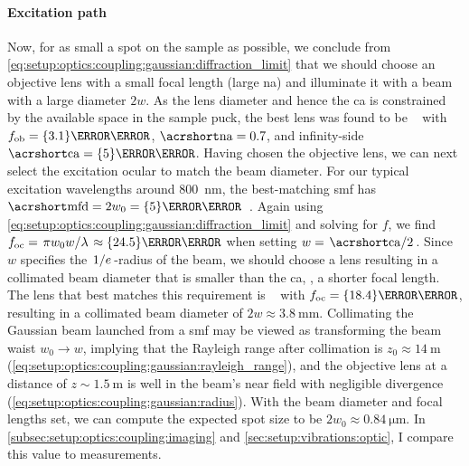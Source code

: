 \paragraph{Excitation path}
Now, for as small a spot on the sample as possible, we conclude from \cref{eq:setup:optics:coupling:gaussian:diffraction_limit} that we should choose an objective lens with a small focal length \fob (large \acrshort{na}) and illuminate it with a beam with a large diameter $2 w$.
As the lens diameter and hence the \acrfull{ca}
is constrained by the available space in the sample puck, the best lens was found to be \objectivelens~\cite{Thorlabs354330} with $\fob = \qty{3.1}{\milli\meter}$, $\NA = \num{0.7}$, and infinity-side $\CA = \qty{5}{\milli\meter}$.
Having chosen the objective lens, we can next select the excitation ocular to match the beam diameter.
For our typical excitation wavelengths around \qty{800}{\nano\meter}, the best-matching \gls{smf} has $\MFD = 2 w_0 = \qty{5}{\micro\meter}$~\cite{Thorlabs780HP}.
Again using \cref{eq:setup:optics:coupling:gaussian:diffraction_limit} and solving for $f$, we find $\foc = \flatfrac{\pi w_0 w}{\lambda} \approx \qty{24.5}{\milli\meter}$ when setting $w = \flatfrac{\CA}{2}$.
Since $w$ specifies the $\flatfrac{1}{e}$-radius of the beam, we should choose a lens resulting in a collimated beam diameter that is smaller than the \gls{ca}, \ie, a shorter focal length.
The lens that best matches this requirement is \ocularlens~\cite{ThorlabsA280TM} with $\foc = \qty{18.4}{\milli\meter}$, resulting in a collimated beam diameter of $2 w \approx\qty{3.8}{\milli\meter}$.
Collimating the Gaussian beam launched from a \gls{smf} may be viewed as transforming the beam waist $w_0\to w$, implying that the Rayleigh range after collimation is $z_0\approx\qty{14}{\meter}$ (\cref{eq:setup:optics:coupling:gaussian:rayleigh_range}), and the objective lens at a distance of $z\sim\qty{1.5}{\meter}$ is well in the beam's near field with negligible divergence (\cf \cref{eq:setup:optics:coupling:gaussian:radius}).
With the beam diameter and focal lengths set, we can compute the expected spot size to be $2 w_0\approx\qty{0.84}{\micro\meter}$.
In \cref{subsec:setup:optics:coupling:imaging} and \cref{sec:setup:vibrations:optic}, I compare this value to measurements.

